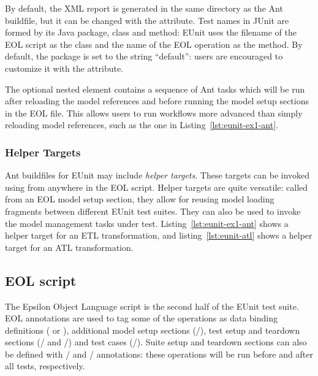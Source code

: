 By default, the XML report is generated in the same directory as the Ant buildfile, but it can be changed with the  attribute. Test names in JUnit are formed by its Java package, class and method: EUnit uses the filename of the EOL script as the class and the name of the EOL operation as the method. By default, the package is set to the string ``default'': users are encouraged to customize it with the  attribute.

The optional  nested element contains a sequence of Ant tasks which will be run after reloading the model references and before running the model setup sections in the EOL file. This allows users to run workflows more advanced than simply reloading model references, such as the one in Listing~\ref{lst:eunit-ex1-ant}.

\subsubsection{Helper Targets}

Ant buildfiles for EUnit may include \emph{helper targets}. These targets can be invoked using  from anywhere in the EOL script. Helper targets are quite versatile: called from an EOL model setup section, they allow for reusing model loading fragments between different EUnit test suites. They can also be used to invoke the model management tasks under test. Listing~\ref{lst:eunit-ex1-ant} shows a helper target for an ETL transformation, and listing~\ref{lst:eunit-atl} shows a helper target for an ATL transformation.

\subsection{EOL script}
\label{sec:eunit-eol-script}

The Epsilon Object Language script is the second half of the EUnit test suite. EOL annotations are used to tag some of the operations as data binding definitions ( or ), additional model setup sections (/), test setup and teardown sections (/ and /) and test cases (/). Suite setup and teardown sections can also be defined with / and / annotations: these operations will be run before and after all tests, respectively.

